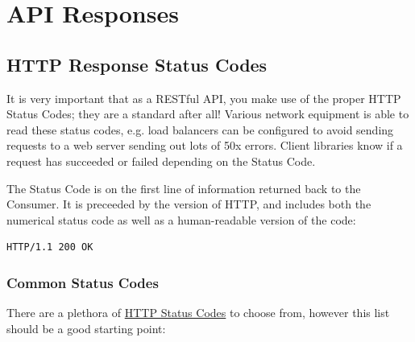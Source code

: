 \documentclass{book}
\begin{document}
\chapter{API Responses}

\section{HTTP Response Status Codes}

It is very important that as a RESTful API, you make use of the proper HTTP Status Codes; they are a standard after all! Various network equipment is able to read these status codes, e.g. load balancers can be configured to avoid sending requests to a web server sending out lots of 50x errors. Client libraries know if a request has succeeded or failed depending on the Status Code.

The Status Code is on the first line of information returned back to the Consumer. It is preceeded by the version of HTTP, and includes both the numerical status code as well as a human-readable version of the code:

\begin{verbatim}
HTTP/1.1 200 OK
\end{verbatim}

\subsection{Common Status Codes}

There are a plethora of \href{http://www.w3.org/Protocols/rfc2616/rfc2616-sec10.html}{HTTP Status Codes} to choose from, however this list should be a good starting point:
\end{document}
